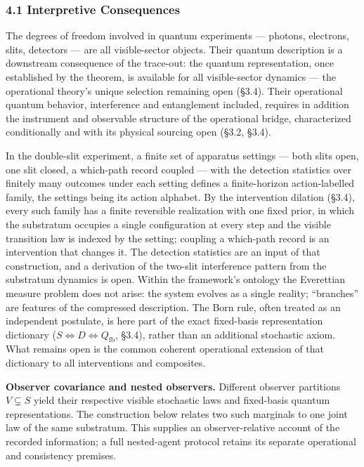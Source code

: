\documentclass[
]{article}
\begin{document}
\hypertarget{interpretive-consequences}{%
\subsubsection{4.1 Interpretive
Consequences}\label{interpretive-consequences}}

The degrees of freedom involved in quantum experiments --- photons,
electrons, slits, detectors --- are all visible-sector objects. Their
quantum description is a downstream consequence of the trace-out: the
quantum representation, once established by the theorem, is available
for all visible-sector dynamics --- the operational theory's unique
selection remaining open (§3.4). Their operational quantum behavior,
interference and entanglement included, requires in addition the
instrument and observable structure of the operational bridge,
characterized conditionally and with its physical sourcing open (§3.2,
§3.4).

In the double-slit experiment, a finite set of apparatus settings ---
both slits open, one slit closed, a which-path record coupled --- with
the detection statistics over finitely many outcomes under each setting
defines a finite-horizon action-labelled family, the settings being its
action alphabet. By the intervention dilation (§3.4), every such family
has a finite reversible realization with one fixed prior, in which the
substratum occupies a single configuration at every step and the visible
transition law is indexed by the setting; coupling a which-path record
is an intervention that changes it. The detection statistics are an
input of that construction, and a derivation of the two-slit
interference pattern from the substratum dynamics is open. Within the
framework's ontology the Everettian measure problem does not arise: the
system evolves as a single reality; ``branches'' are features of the
compressed description. The Born rule, often treated as an independent
postulate, is here part of the exact fixed-basis representation
dictionary (\(S \iff D \iff Q_{\mathrm{fb}}\), §3.4), rather than an
additional stochastic axiom. What remains open is the common coherent
operational extension of that dictionary to all interventions and
composites.

\textbf{Observer covariance and nested observers.} Different observer
partitions \(V \subsetneq S\) yield their respective visible stochastic
laws and fixed-basis quantum representations. The construction below
relates two such marginals to one joint law of the same substratum. This
supplies an observer-relative account of the recorded information; a
full nested-agent protocol retains its separate operational and
consistency premises.
\end{document}
